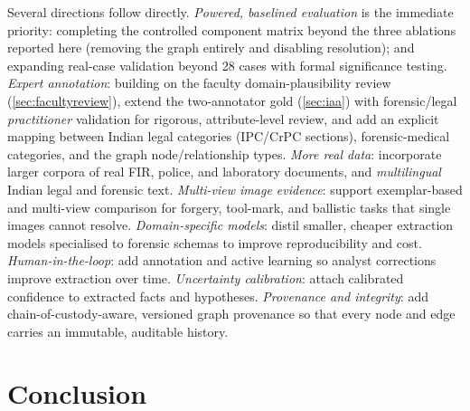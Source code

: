 \documentclass[conference]{IEEEtran}
\begin{document}
Several directions follow directly. \emph{Powered, baselined evaluation} is the
immediate priority: completing the controlled component matrix beyond the three
ablations reported here (removing the graph entirely and
disabling resolution); and expanding real-case validation beyond 28 cases with
formal significance testing. \emph{Expert
annotation}: building on the faculty domain-plausibility review
(\cref{sec:facultyreview}), extend the two-annotator gold (\cref{sec:iaa}) with
forensic/legal \emph{practitioner} validation for rigorous, attribute-level review,
and add an explicit mapping between Indian legal categories (IPC/CrPC sections),
forensic-medical categories, and the graph node/relationship types. \emph{More real data}: incorporate larger
corpora of real FIR, police, and laboratory documents, and \emph{multilingual}
Indian legal and forensic text. \emph{Multi-view image evidence}: support
exemplar-based and multi-view comparison for forgery, tool-mark, and ballistic
tasks that single images cannot resolve. \emph{Domain-specific models}: distil
smaller, cheaper extraction models specialised to forensic schemas to improve
reproducibility and cost. \emph{Human-in-the-loop}: add annotation and active
learning so analyst corrections improve extraction over time. \emph{Uncertainty
calibration}: attach calibrated confidence to extracted facts and hypotheses.
\emph{Provenance and integrity}: add chain-of-custody-aware, versioned graph
provenance so that every node and edge carries an immutable, auditable history.

\section{Conclusion}
\label{sec:conclusion}
\end{document}
